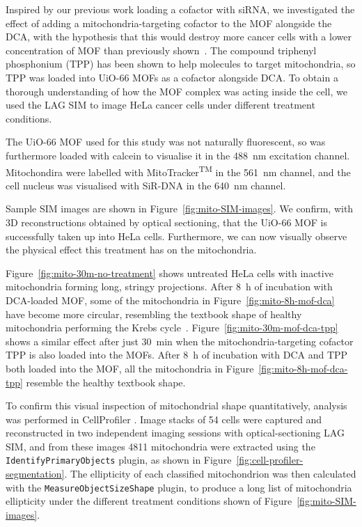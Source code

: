 Inspired by our previous work loading a cofactor with siRNA, we investigated the effect of adding a mitochondria-targeting cofactor to the MOF alongside the DCA, with the hypothesis that this would destroy more cancer cells with a lower concentration of MOF than previously shown~\cite{abanades2018mechanistic}.
The compound triphenyl phosphonium (TPP) has been shown to help molecules to target mitochondria, so TPP was loaded into UiO-66 MOFs as a cofactor alongside DCA.
To obtain a thorough understanding of how the MOF complex was acting inside the cell, we used the LAG SIM to image HeLa cancer cells under different treatment conditions.

The UiO-66 MOF used for this study was not naturally fluorescent, so was furthermore loaded with calcein to visualise it in the \SI{488}{\nano\metre} excitation channel.
Mitochondira were labelled with MitoTracker\textsuperscript{TM} in the \SI{561}{\nano\metre} channel, and the cell nucleus was visualised with SiR-DNA in the \SI{640}{\nano\metre} channel.

Sample SIM images are shown in Figure~\ref{fig:mito-SIM-images}.
We confirm, with 3D reconstructions obtained by optical sectioning, that the UiO-66 MOF is successfully taken up into HeLa cells.
Furthermore, we can now visually observe the physical effect this treatment has on the mitochondria.

Figure~\ref{fig:mito-30m-no-treatment} shows untreated HeLa cells with inactive mitochondria forming long, stringy projections.
After \SI{8}{\hour} of incubation with DCA-loaded MOF, some of the mitochondria in Figure~\ref{fig:mito-8h-mof-dca} have become more circular, resembling the textbook shape of healthy mitochondria performing the Krebs cycle~\cite{murray1993cell}.
Figure~\ref{fig:mito-30m-mof-dca-tpp} shows a similar effect after just \SI{30}{\minute} when the mitochondria-targeting cofactor TPP is also loaded into the MOFs.
After \SI{8}{\hour} of incubation with DCA and TPP both loaded into the MOF, all the mitochondria in Figure~\ref{fig:mito-8h-mof-dca-tpp} resemble the healthy textbook shape.

To confirm this visual inspection of mitochondrial shape quantitatively, analysis was performed in CellProfiler \cite{carpenter2006cellprofiler}.
Image stacks of 54 cells were captured and reconstructed in two independent imaging sessions with optical-sectioning LAG SIM, and from these images \num{4811} mitochondria were extracted using the \texttt{IdentifyPrimaryObjects} plugin, as shown in Figure~\ref{fig:cell-profiler-segmentation}.
The ellipticity of each classified mitochondrion was then calculated with the \texttt{MeasureObjectSizeShape} plugin, to produce a long list of mitochondria ellipticity under the different treatment conditions shown of Figure~\ref{fig:mito-SIM-images}.

